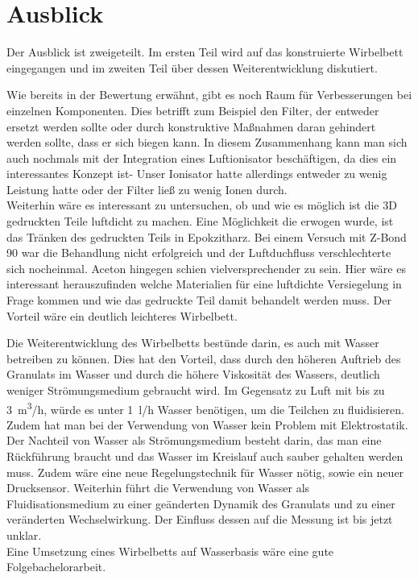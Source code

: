 \section{Ausblick}

Der Ausblick ist zweigeteilt. Im ersten Teil wird auf das konstruierte Wirbelbett eingegangen und im zweiten Teil über dessen Weiterentwicklung diskutiert. 

Wie bereits in der Bewertung erwähnt, gibt es noch Raum für Verbesserungen bei einzelnen Komponenten. Dies betrifft zum Beispiel den Filter, der entweder ersetzt werden sollte oder durch konstruktive Maßnahmen daran gehindert werden sollte, dass er sich biegen kann. In diesem Zusammenhang kann man sich auch nochmals mit der Integration eines Luftionisator beschäftigen, da dies ein interessantes Konzept ist- Unser Ionisator hatte allerdings entweder zu wenig Leistung hatte oder der Filter ließ zu wenig Ionen durch. \\
Weiterhin wäre es interessant zu untersuchen, ob und wie es möglich ist die 3D gedruckten Teile luftdicht zu machen. Eine Möglichkeit die erwogen wurde, ist das Tränken des gedruckten Teils in Epokzitharz. Bei einem Versuch mit Z-Bond 90 war die Behandlung nicht erfolgreich und der Luftduchfluss verschlechterte sich nocheinmal. Aceton hingegen schien vielversprechender zu sein. Hier wäre es interessant herauszufinden welche Materialien für eine luftdichte Versiegelung in Frage kommen und wie das gedruckte Teil damit behandelt werden muss. Der Vorteil wäre ein deutlich leichteres Wirbelbett.

Die Weiterentwicklung des Wirbelbetts bestünde darin, es auch mit Wasser betreiben zu können. Dies hat den Vorteil, dass durch den höheren Auftrieb des Granulats im Wasser und durch die höhere Viskosität des Wassers, deutlich weniger Strömungsmedium gebraucht wird. Im Gegensatz zu Luft mit bis zu \SI{3}{m^3/h}, würde es unter \SI{1}{l/h} Wasser benötigen, um die Teilchen zu fluidisieren. Zudem hat man bei der Verwendung von Wasser kein Problem mit Elektrostatik. \\
Der Nachteil von Wasser als Strömungsmedium besteht darin, das man eine Rückführung braucht und das Wasser im Kreislauf auch sauber gehalten werden muss. Zudem wäre eine neue Regelungstechnik für Wasser nötig, sowie ein neuer Drucksensor. Weiterhin führt die Verwendung von Wasser als Fluidisationsmedium zu einer geänderten Dynamik des Granulats und zu einer veränderten Wechselwirkung. Der Einfluss dessen auf die Messung ist bis jetzt unklar.  \\
Eine Umsetzung eines Wirbelbetts auf Wasserbasis wäre eine gute Folgebachelorarbeit.


